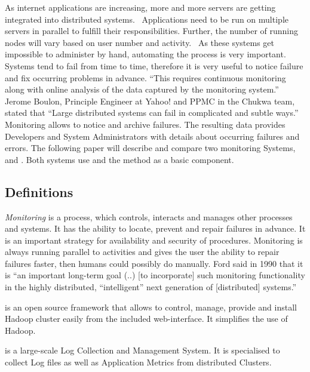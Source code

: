 As internet applications are increasing, more and more servers are getting integrated into distributed systems.~\cite{Dinu2011} Applications need to be run on multiple servers in parallel to fulfill their responsibilities. 
Further, the number of running nodes will vary based on user number and activity.~\cite{Jammes2012} 
As these systems get impossible to administer by hand, automating the process is very important.~\cite{Jammes2012} 
Systems tend to fail from time to time, therefore it is very useful to notice failure and fix occurring problems in advance. 
``This requires continuous monitoring along with online analysis of the data captured by the monitoring system.''~\cite{Kutare2010}
Jerome Boulon, Principle Engineer at Yahoo! and PPMC in the Chukwa team, stated that ``Large distributed systems can fail in complicated and subtle ways.''~\cite{Boulonb} 
Monitoring allows to notice and archive failures. 
The resulting data provides Developers and System Administrators with details about occurring failures and errors. 
The following paper will describe and compare two monitoring Systems, \amb and \chuk. 
Both systems use \hadoop and the \mr method as a basic component.\cite{ApacheSoftwareFoundation2015}


\subsection{Definitions}

\textit{Monitoring} is a process, which controls, interacts and manages other processes and systems. 
It has the ability to locate, prevent and repair failures in advance. 
It is an important strategy for availability and security of procedures. 
Monitoring is always running parallel to activities and gives the user the ability to repair failures faster, then humans could possibly do manually.\cite{Jammes2012}
Ford said in 1990 that it is ``an important long-term goal (..) [to incorporate] such monitoring functionality in the highly distributed, ``intelligent'' next generation of [distributed] systems.''~\cite{Ford1990}

\amb is an open source framework that allows to control, manage, provide and install Hadoop cluster easily from the included web-interface. It simplifies the use of Hadoop.\cite{Hortonworks2013}

\chuk is a large-scale Log Collection and Management System. It is specialised to collect Log files as well as Application Metrics from distributed Clusters.

